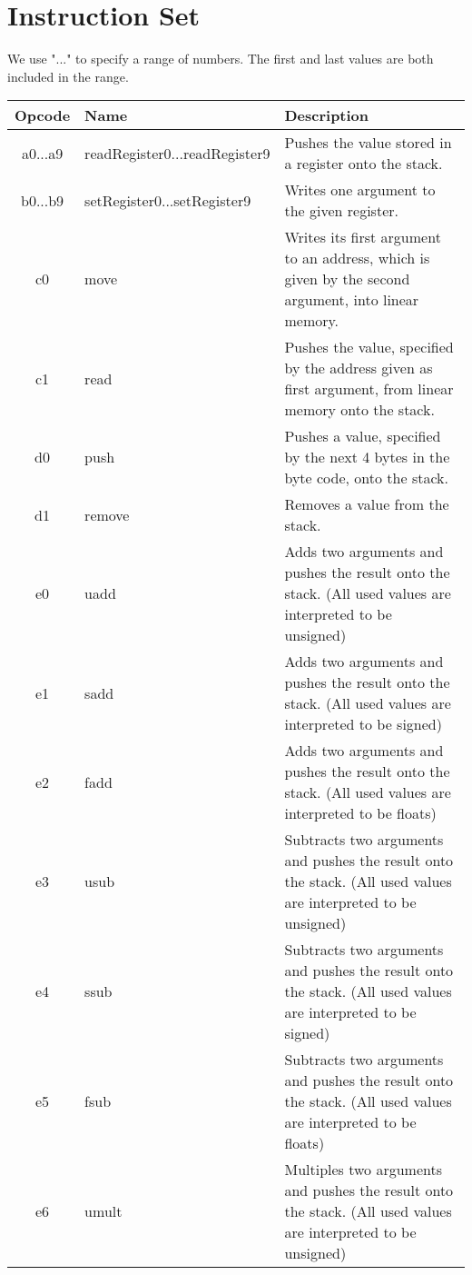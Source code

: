 \documentclass[10pt,a4paper]{article}
\begin{document}
	\newpage
	\section{Instruction Set}
	\label{instruction_set}
	{\small We use "..." to specify a range of numbers. The first and last values are both included in the range.} \\
	\begin{longtable}[c]{c|l|p{9cm}}
		\hline
		Opcode & Name & Description \\
		\hline
		\hex a0...\hex a9 & readRegister0...readRegister9 & Pushes the value stored in a register onto the stack. \\
		\hline
		\hex b0...\hex b9 & setRegister0...setRegister9 & Writes one argument to the given register. \\
		\hline
		\hline
		\hex c0 & move & Writes its first argument to an address, which is given by the second argument, into linear memory. \\
		\hline		
		\hex c1 & read & Pushes the value, specified by the address given as first argument, from linear memory onto the stack. \\
		\hline	
		\hline	
		\hex d0 & push & Pushes a value, specified by the next 4 bytes in the byte code, onto the stack. \\
		\hline		
		\hex d1 & remove & Removes a value from the stack. \\
		\hline	
		\hline	
		\hex e0 & uadd & Adds two arguments and pushes the result onto the stack. (All used values are interpreted to be unsigned) \\
		\hline		
		\hex e1 & sadd & Adds two arguments and pushes the result onto the stack. (All used values are interpreted to be signed) \\
		\hline		
		\hex e2 & fadd & Adds two arguments and pushes the result onto the stack. (All used values are interpreted to be floats) \\
		\hline		
		\hex e3 & usub & Subtracts two arguments and pushes the result onto the stack. (All used values are interpreted to be unsigned) \\
		\hline		
		\hex e4 & ssub & Subtracts two arguments and pushes the result onto the stack. (All used values are interpreted to be signed) \\		
		\hline
		\hex e5 & fsub & Subtracts two arguments and pushes the result onto the stack. (All used values are interpreted to be floats) \\		
		\hline
		\hex e6 & umult & Multiples two arguments and pushes the result onto the stack. (All used values are interpreted to be unsigned) \\	

\end{longtable}
\end{document}

